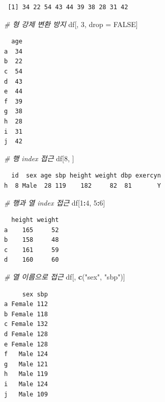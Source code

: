 \documentclass[
  11pt,
]{krantz}
\newenvironment{Shaded}{\begin{snugshade}}{\end{snugshade}}
\newcommand{\CommentTok}[1]{\textcolor[rgb]{0.37,0.37,0.37}{\textit{#1}}}
\newcommand{\DecValTok}[1]{\textcolor[rgb]{0.06,0.06,0.06}{#1}}
\newcommand{\KeywordTok}[1]{\textcolor[rgb]{0.27,0.27,0.27}{\textbf{#1}}}
\newcommand{\NormalTok}[1]{#1}
\newcommand{\OperatorTok}[1]{\textcolor[rgb]{0.43,0.43,0.43}{\textbf{#1}}}
\newcommand{\OtherTok}[1]{\textcolor[rgb]{0.37,0.37,0.37}{#1}}
\newcommand{\StringTok}[1]{\textcolor[rgb]{0.5,0.5,0.5}{#1}}
\begin{document}
\begin{verbatim}
 [1] 34 22 54 43 44 39 38 28 31 42
\end{verbatim}

\begin{Shaded}
\begin{Highlighting}[]
\CommentTok{# 형 강제 변환 방지}
\NormalTok{df[, }\DecValTok{3}\NormalTok{, drop =}\StringTok{ }\OtherTok{FALSE}\NormalTok{]}
\end{Highlighting}
\end{Shaded}

\begin{verbatim}
  age
a  34
b  22
c  54
d  43
e  44
f  39
g  38
h  28
i  31
j  42
\end{verbatim}

\begin{Shaded}
\begin{Highlighting}[]
\CommentTok{# 행 index 접근}
\NormalTok{df[}\DecValTok{8}\NormalTok{, ]}
\end{Highlighting}
\end{Shaded}

\begin{verbatim}
  id  sex age sbp height weight dbp exercyn
h  8 Male  28 119    182     82  81       Y
\end{verbatim}

\begin{Shaded}
\begin{Highlighting}[]
\CommentTok{# 행과 열 index 접근}
\NormalTok{df[}\DecValTok{1}\OperatorTok{:}\DecValTok{4}\NormalTok{, }\DecValTok{5}\OperatorTok{:}\DecValTok{6}\NormalTok{]}
\end{Highlighting}
\end{Shaded}

\begin{verbatim}
  height weight
a    165     52
b    158     48
c    161     59
d    160     60
\end{verbatim}

\begin{Shaded}
\begin{Highlighting}[]
\CommentTok{# 열 이름으로 접근}
\NormalTok{df[, }\KeywordTok{c}\NormalTok{(}\StringTok{"sex"}\NormalTok{, }\StringTok{"sbp"}\NormalTok{)]}
\end{Highlighting}
\end{Shaded}

\begin{verbatim}
     sex sbp
a Female 112
b Female 118
c Female 132
d Female 128
e Female 128
f   Male 124
g   Male 121
h   Male 119
i   Male 124
j   Male 109
\end{verbatim}
\end{document}
